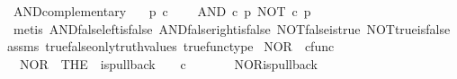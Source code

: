 \begin{isabellebody}
\endisatagproof
{\isafoldproof}%
%
\isadelimproof
\isanewline
%
\endisadelimproof
\isanewline
{}\isamarkupfalse%
\ AND{\isacharunderscore}{\kern0pt}complementary{\isacharcolon}{\kern0pt}\isanewline
\ \ \ {\isachardoublequoteopen}p\ {\isasymin}\isactrlsub c\ {\isasymOmega}{\isachardoublequoteclose}\isanewline
\ \ \ {\isachardoublequoteopen}AND\ {\isasymcirc}\isactrlsub c\ {\isasymlangle}p{\isacharcomma}{\kern0pt}\ NOT\ {\isasymcirc}\isactrlsub c\ p{\isasymrangle}\ {\isacharequal}{\kern0pt}\ \ {\isasymf}{\isachardoublequoteclose}\isanewline
%
\isadelimproof
\ \ %
\endisadelimproof
%
\isatagproof
{}\isamarkupfalse%
\ {\isacharparenleft}{\kern0pt}metis\ AND{\isacharunderscore}{\kern0pt}false{\isacharunderscore}{\kern0pt}left{\isacharunderscore}{\kern0pt}is{\isacharunderscore}{\kern0pt}false\ AND{\isacharunderscore}{\kern0pt}false{\isacharunderscore}{\kern0pt}right{\isacharunderscore}{\kern0pt}is{\isacharunderscore}{\kern0pt}false\ NOT{\isacharunderscore}{\kern0pt}false{\isacharunderscore}{\kern0pt}is{\isacharunderscore}{\kern0pt}true\ NOT{\isacharunderscore}{\kern0pt}true{\isacharunderscore}{\kern0pt}is{\isacharunderscore}{\kern0pt}false\ assms\ true{\isacharunderscore}{\kern0pt}false{\isacharunderscore}{\kern0pt}only{\isacharunderscore}{\kern0pt}truth{\isacharunderscore}{\kern0pt}values\ true{\isacharunderscore}{\kern0pt}func{\isacharunderscore}{\kern0pt}type{\isacharparenright}{\kern0pt}%
\endisatagproof
{\isafoldproof}%
%
\isadelimproof
%
\endisadelimproof
%
\isadelimdocument
%
\endisadelimdocument
%
\isatagdocument
%
\isamarkuptrue%
%
\endisatagdocument
{\isafolddocument}%
%
\isadelimdocument
%
\endisadelimdocument
{}\isamarkupfalse%
\ NOR\ {\isacharcolon}{\kern0pt}{\isacharcolon}{\kern0pt}\ {\isachardoublequoteopen}cfunc{\isachardoublequoteclose}\ \isanewline
\ \ {\isachardoublequoteopen}NOR\ {\isacharequal}{\kern0pt}\ {\isacharparenleft}{\kern0pt}THE\ {\isasymchi}{\isachardot}{\kern0pt}\ is{\isacharunderscore}{\kern0pt}pullback\ \ {\isasymone}\ {\isasymone}\ {\isacharparenleft}{\kern0pt}{\isasymOmega}{\isasymtimes}\isactrlsub c{\isasymOmega}{\isacharparenright}{\kern0pt}\ {\isasymOmega}\ {\isacharparenleft}{\kern0pt}{\isasymbeta}\isactrlbsub {\isasymone}\isactrlesub {\isacharparenright}{\kern0pt}\ {\isasymt}\ {\isasymlangle}{\isasymf}{\isacharcomma}{\kern0pt}\ {\isasymf}{\isasymrangle}\ {\isasymchi}{\isacharparenright}{\kern0pt}{\isachardoublequoteclose}\isanewline
\isanewline
{}\isamarkupfalse%
\ NOR{\isacharunderscore}{\kern0pt}is{\isacharunderscore}{\kern0pt}pullback{\isacharcolon}{\kern0pt}\isanewline

\end{isabellebody}
